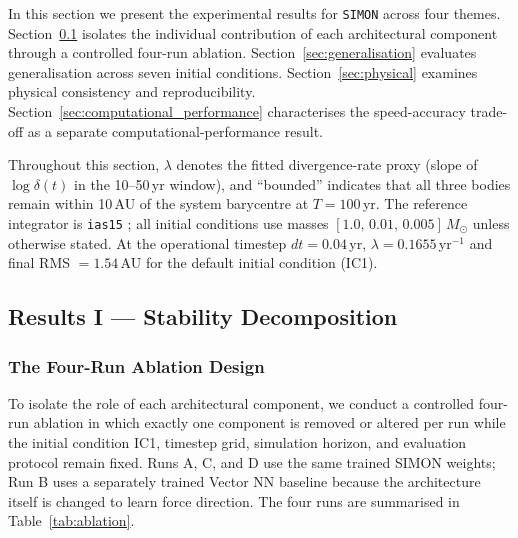 \documentclass[12pt]{article}
\begin{document}
In this section we present the experimental results for \texttt{SIMON} across four
themes. Section~\ref{sec:stability} isolates the individual contribution of each
architectural component through a controlled four-run ablation. Section~\ref{sec:generalisation}
evaluates generalisation across seven initial conditions. Section~\ref{sec:physical}
examines physical consistency and reproducibility. Section~\ref{sec:computational_performance}
characterises the speed-accuracy trade-off as a separate computational-performance result.

Throughout this section, $\lambda$ denotes the fitted divergence-rate proxy (slope of
$\log\delta(t)$ in the 10--50\,yr window), and ``bounded'' indicates that all three
bodies remain within 10\,AU of the system barycentre at $T = 100$\,yr. The reference
integrator is \texttt{ias15} \citep{Rein_2014}; all initial conditions use masses
$[1.0,\,0.01,\,0.005]\,M_\odot$ unless otherwise stated. At the operational timestep
$dt = 0.04$\,yr, $\lambda = 0.1655$\,yr$^{-1}$ and final RMS $= 1.54$\,AU for the
default initial condition (IC1).

\subsection{Results I --- Stability Decomposition}
\label{sec:stability}

\subsubsection{The Four-Run Ablation Design}

To isolate the role of each architectural component, we conduct a controlled four-run
ablation in which exactly one component is removed or altered per run while the initial
condition IC1, timestep grid, simulation horizon, and evaluation protocol remain fixed. Runs
A, C, and D use the same trained SIMON weights; Run B uses a separately trained
Vector NN baseline because the architecture itself is changed to learn force direction.
The four runs are summarised in
Table~\ref{tab:ablation}.

\begin{table}[H]
\centering
\caption{Four-run ablation framework for IC1 over $T=100$\,yr. Each run removes or replaces one component of the full \texttt{SIMON} configuration.}
\label{tab:ablation}
\end{table}
\end{document}
